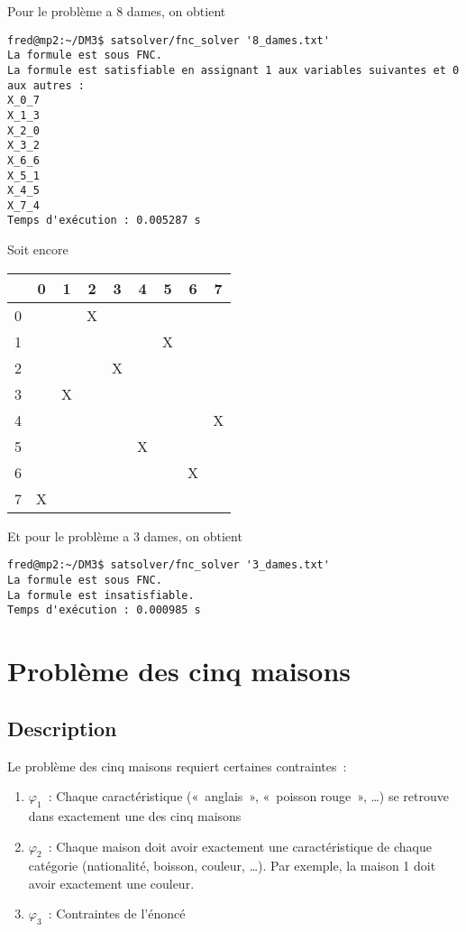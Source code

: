     Pour le problème a 8 dames, on obtient
    \begin{lstlisting}
fred@mp2:~/DM3$ satsolver/fnc_solver '8_dames.txt'
La formule est sous FNC.
La formule est satisfiable en assignant 1 aux variables suivantes et 0 aux autres :
X_0_7
X_1_3
X_2_0
X_3_2
X_6_6
X_5_1
X_4_5
X_7_4
Temps d'exécution : 0.005287 s
    \end{lstlisting}
    Soit encore
    \begin{center}
        \begin{tabular}{| c || *{8}{c |}}
        \hline
          & 0 & 1 & 2 & 3 & 4 & 5 & 6 & 7 \\
        \hline
        \hline
        0 &   &   & X &   &   &   &   &   \\
        \hline
        1 &   &   &   &   &   & X &   &   \\
        \hline
        2 &   &   &   & X &   &   &   &   \\
        \hline
        3 &   & X &   &   &   &   &   &   \\
        \hline
        4 &   &   &   &   &   &   &   & X \\
        \hline
        5 &   &   &   &   & X &   &   &   \\
        \hline
        6 &   &   &   &   &   &   & X &   \\
        \hline
        7 & X &   &   &   &   &   &   &   \\
        \hline
        \end{tabular}
    \end{center}
    
    Et pour le problème a 3 dames, on obtient
    \begin{lstlisting}
fred@mp2:~/DM3$ satsolver/fnc_solver '3_dames.txt'
La formule est sous FNC.
La formule est insatisfiable.
Temps d'exécution : 0.000985 s
    \end{lstlisting}


\section{Problème des cinq maisons}
\subsection{Description}
Le problème des cinq maisons requiert certaines contraintes~:
\begin{enumerate}
    \item $\varphi_1$~: Chaque caractéristique («~anglais~», «~poisson
        rouge~», …) se retrouve dans exactement une des cinq maisons
    \item $\varphi_2$~: Chaque maison doit avoir exactement une caractéristique de chaque
        catégorie (nationalité, boisson, couleur, …). Par exemple, la maison
        1 doit avoir exactement une couleur.
    \item $\varphi_3$~: Contraintes de l’énoncé
\end{enumerate}

